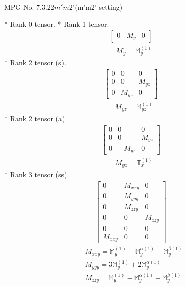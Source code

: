 \documentclass[fleqn,8pt,landscape]{jsarticle}
\begin{document}
\setcounter{MaxMatrixCols}{32}

\renewcommand{\tablename}{Table~}
\renewcommand{\figurename}{Figure~}
\begin{center}
\LARGE
MPG No. 7.3.22\quad$m'm2'$\quad(m'm2' setting)
\end{center}
* Rank 0 tensor.
* Rank 1 tensor.
\begin{align*}
\begin{bmatrix} 0 & M_{y} & 0 \end{bmatrix}
\end{align*}
\begin{align*}
& M_{y} = \mathbb{M}_{y}^{(1)}
\end{align*}
* Rank 2 tensor (s).
\begin{align*}
\begin{bmatrix} 0 & 0 & 0 \\ 0 & 0 & M_{yz} \\ 0 & M_{yz} & 0 \end{bmatrix}
\end{align*}
\begin{align*}
& M_{yz} = \mathbb{M}_{yz}^{(1)}
\end{align*}
* Rank 2 tensor (a).
\begin{align*}
\begin{bmatrix} 0 & 0 & 0 \\ 0 & 0 & M_{yz} \\ 0 & - M_{yz} & 0 \end{bmatrix}
\end{align*}
\begin{align*}
& M_{yz} = \mathbb{T}_{x}^{(1)}
\end{align*}
* Rank 3 tensor (ss).
\begin{align*}
\begin{bmatrix} 0 & M_{xxy} & 0 \\ 0 & M_{yyy} & 0 \\ 0 & M_{zzy} & 0 \\ 0 & 0 & M_{zzy} \\ 0 & 0 & 0 \\ M_{xxy} & 0 & 0 \end{bmatrix}
\end{align*}
\begin{align*}
& M_{xxy} = \mathbb{M}_{y}^{(1)} - \mathbb{M}_{y}^{\alpha(1)} - \mathbb{M}_{y}^{\beta(1)} \\
& M_{yyy} = 3 \mathbb{M}_{y}^{(1)} + 2 \mathbb{M}_{y}^{\alpha(1)} \\
& M_{zzy} = \mathbb{M}_{y}^{(1)} - \mathbb{M}_{y}^{\alpha(1)} + \mathbb{M}_{y}^{\beta(1)}
\end{align*}
\end{document}
